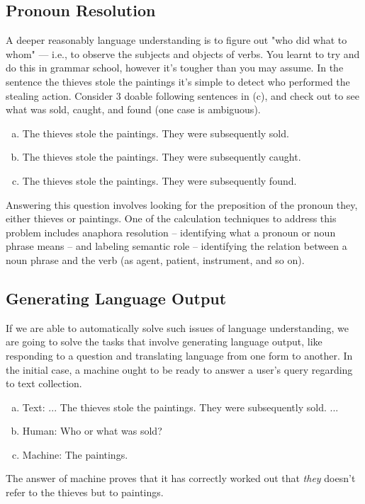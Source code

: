 \subsection{Pronoun Resolution}
A deeper reasonably language understanding is to figure out "who did what to whom" — i.e., to observe the subjects and objects of verbs. You learnt to try and do this in grammar school, however it's tougher than you may assume. In the sentence the thieves stole the paintings it's simple to detect who performed the stealing action. Consider 3 doable following sentences in (c), and check out to see what was sold, caught, and found (one case is ambiguous).
\begin{enumerate}[a.]
    \item The thieves stole the paintings. They were subsequently sold.
    \item The thieves stole the paintings. They were subsequently caught.
    \item The thieves stole the paintings. They were subsequently found.
\end{enumerate}
Answering this question involves looking for the preposition of the pronoun they, either thieves or paintings. One of the calculation techniques to address this problem includes anaphora resolution -- identifying what a pronoun or noun phrase means -- and labeling semantic role -- identifying the relation between a noun phrase and the verb (as agent, patient, instrument, and so on).

\subsection{Generating Language Output}
If we are able to automatically solve such issues of language understanding, we are going to solve the tasks that involve generating language output, like responding to a question and translating language from one form to another. In the initial case, a machine ought to be ready to answer a user's query regarding to text collection.

\begin{enumerate}[a.]
    \item Text: ... The thieves stole the paintings. They were subsequently sold. ...
    \item Human: Who or what was sold?
    \item Machine: The paintings.
\end{enumerate}
The answer of machine proves that it has correctly worked out that \emph{they} doesn't refer to the thieves but to paintings. 

